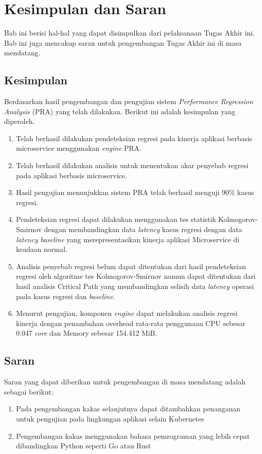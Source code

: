 \chapter{Kesimpulan dan Saran}
Bab ini berisi hal-hal yang dapat disimpulkan dari pelaksanaan Tugas Akhir ini. Bab ini juga mencakup saran untuk pengembangan Tugas Akhir ini di masa mendatang.

\section{Kesimpulan}
Berdasarkan hasil pengembangan dan pengujian sistem \textit{Performance Regression Analysis} (PRA) yang telah dilakukan. Berikut ini adalah kesimpulan yang diperoleh.
\begin{enumerate}
	\item Telah berhasil dilakukan pendeteksian regresi pada kinerja aplikasi berbasis microservice menggunakan \textit{engine} PRA.
	\item Telah berhasil dilakukan analisis untuk menentukan akar penyebab regresi pada aplikasi berbasis microservice.
	\item Hasil pengujian menunjukkan sistem PRA telah berhasil menguji 90\% kasus regresi.
	\item Pendeteksian regresi dapat dilakukan menggunakan tes statistik Kolmogorov-Smirnov dengan membandingkan data \textit{latency} kasus regresi dengan data \textit{latency} \textit{baseline} yang merepresentasikan kinerja aplikasi Microservice di keadaan normal.
	\item Analisis penyebab regresi belum dapat ditentukan dari hasil pendeteksian regresi oleh algoritme tes Kolmogorov-Smirnov namun dapat ditentukan dari hasil analisis Critical Path yang membandingkan selisih data \textit{latency} operasi pada kasus regresi dan \textit{baseline}.
	\item Menurut pengujian, komponen \textit{engine} dapat melakukan analisis regresi kinerja dengan penambahan overhead rata-rata penggunaan CPU sebesar 0.047 \textit{core} dan Memory sebesar 154.412 MiB.
\end{enumerate}

\section{Saran}
Saran yang dapat diberikan untuk pengembangan di masa mendatang adalah sebagai berikut:
\begin{enumerate}
	\item Pada pengembangan kakas selanjutnya dapat ditambahkan penanganan untuk pengujian pada lingkungan aplikasi selain Kubernetes
	\item Pengembangan kakas menggunakan bahasa pemrograman yang lebih cepat dibandingkan Python seperti Go atau Rust
\end{enumerate}